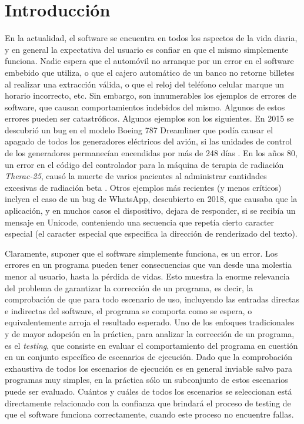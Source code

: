 \chapter{Introducci\'on}
\label{cap:introduccion}

En la actualidad, el software se encuentra en todos los aspectos de la vida diaria, y en general la expectativa del usuario es confiar en que el mismo simplemente funciona. Nadie espera que el autom\'ovil no arranque por un error en el software embebido que utiliza, o que el cajero autom\'atico de un banco no retorne billetes al realizar una extracci\'on v\'alida, o que el reloj del tel\'efono celular marque un horario incorrecto, etc. Sin embargo, son innumerables los ejemplos de errores de software, que causan comportamientos indebidos del mismo. Algunos de estos errores pueden ser catastr\'oficos. Algunos ejemplos son los siguientes. En 2015 se descubri\'o un bug en el modelo Boeing 787 Dreamliner que pod\'ia causar el apagado de todos los generadores el\'ectricos del avi\'on, si las unidades de control de los generadores permanec\'ian encendidas por m\'as de 248 d\'ias \cite{bibliography.bugs.boeing}. En los a\~nos 80, un error en el c\'odigo del controlador para la m\'aquina de terapia de radiaci\'on \emph{Therac-25}, caus\'o la muerte de varios pacientes al administrar cantidades excesivas de radiaci\'on beta \cite{bibliography.bugs.Therac25LevesonT93}. Otros ejemplos m\'as recientes (y menos cr\'iticos) inclyen el caso de un bug de WhatsApp, descubierto en 2018, que causaba que la aplicaci\'on, y en muchos casos el dispositivo, dejara de responder, si se recib\'ia un mensaje en Unicode, conteniendo una secuencia que repet\'ia cierto caracter especial (el caracter especial que especifica la direcci\'on de renderizado del texto).

Claramente, suponer que el software simplemente funciona, es un error. Los errores en un programa pueden tener consecuencias que van desde una molestia menor al usuario, hasta la p\'erdida de vidas. Esto muestra la enorme relevancia del problema de garantizar la correcci\'on de un programa, es decir, la comprobaci\'on de que para todo escenario de uso, incluyendo las entradas directas e indirectas del software, el programa se comporta como se espera, o equivalentemente arroja el resultado esperado. Uno de los enfoques tradicionales y de mayor adopci\'on en la pr\'actica, para analizar la correcci\'on de un programa, es el \emph{testing}, que consiste en evaluar el comportamiento del programa en cuesti\'on en un conjunto espec\'ifico de escenarios de ejecuci\'on. Dado que la comprobaci\'on exhaustiva de todos los escenarios de ejecuci\'on es en general inviable salvo para programas muy simples, en la pr\'actica s\'olo un subconjunto de estos escenarios puede ser evaluado. Cu\'antos y cu\'ales de todos los escenarios se seleccionan est\'a directamente relacionado con la confianza que brindar\'a el proceso de testing de que el software funciona correctamente, cuando este proceso no encuentre fallas.

